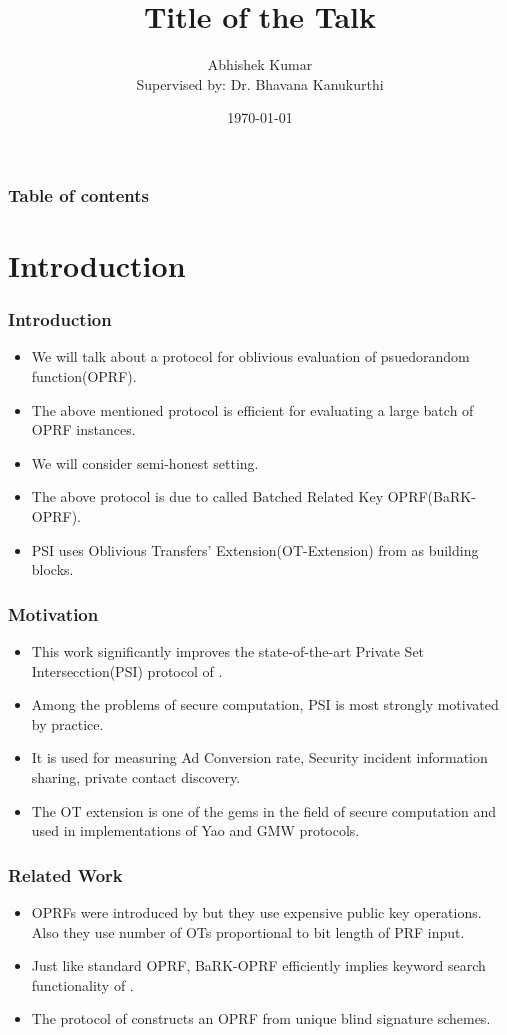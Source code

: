 \documentclass[hyperref={pdfpagelabels=false}]{beamer}
\title{Title of the Talk}
\author[Abhishek Kumar]{Abhishek Kumar\\{\small Supervised by: Dr. Bhavana Kanukurthi}}
\date{\today}
\theoremstyle{remark}
\begin{document}
\begin{frame}
\titlepage
\end{frame} 


\begin{frame}
\frametitle{Table of contents}
\tableofcontents
\end{frame} 


\section{Introduction} 
\begin{frame}
\frametitle{Introduction} 
\begin{itemize}
\item We will talk about a protocol for oblivious evaluation of psuedorandom function(OPRF). \pause
\item The above mentioned protocol is efficient for evaluating a large batch of OPRF instances. \pause
\item We will consider semi-honest setting.\pause
\item The above protocol is due to \cite{KKRT} called Batched Related Key OPRF(BaRK-OPRF).\pause
\item PSI uses Oblivious Transfers' Extension(OT-Extension) from \cite{KK} as building blocks.
\end{itemize}
\end{frame}

\begin{frame}
\frametitle{Motivation}
\begin{itemize}
\item This work significantly improves the state-of-the-art Private Set Intersecction(PSI) protocol of \cite{PSSZ}.\pause
\item Among the problems of secure computation, PSI is most strongly motivated by practice. \pause
\item It is used for measuring Ad Conversion rate, Security incident information sharing, private contact discovery.\pause
\item The \cite{IKNP} OT extension is one of the gems in the field of secure computation and used in implementations of Yao and GMW protocols.
\end{itemize}
 
\end{frame}

\begin{frame}
\frametitle{Related Work}
\begin{itemize}
\item OPRFs were introduced by \cite{FIPR} but they use expensive public key operations. Also they use number of OTs proportional to bit length of PRF input. \pause
\item Just like standard OPRF, BaRK-OPRF efficiently implies keyword search functionality of \cite{FIPR}. \pause
\item The protocol of \cite{CNS} constructs an OPRF from unique blind signature schemes.
\end{itemize}
\end{frame}
\end{document}
